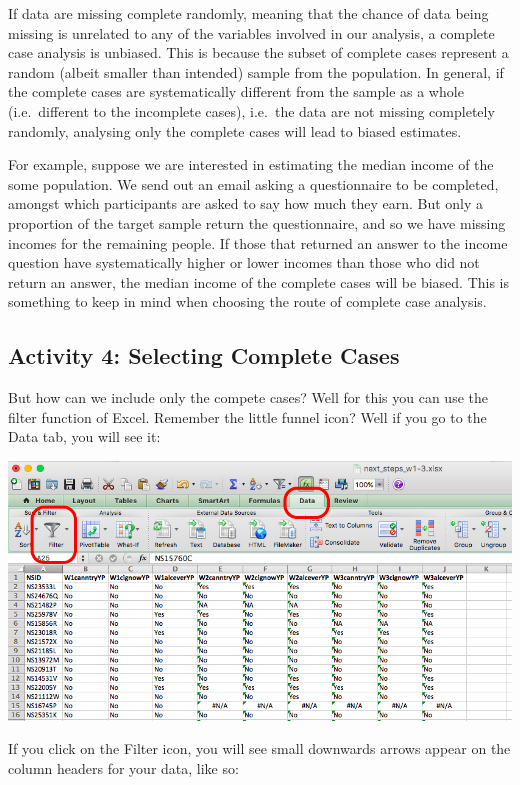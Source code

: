 \documentclass[]{book}
\theoremstyle{definition}
\theoremstyle{definition}
\theoremstyle{definition}
\theoremstyle{remark}
\begin{document}
If data are missing complete randomly, meaning that the chance of data
being missing is unrelated to any of the variables involved in our
analysis, a complete case analysis is unbiased. This is because the
subset of complete cases represent a random (albeit smaller than
intended) sample from the population. In general, if the complete cases
are systematically different from the sample as a whole (i.e.~different
to the incomplete cases), i.e.~the data are not missing completely
randomly, analysing only the complete cases will lead to biased
estimates.

For example, suppose we are interested in estimating the median income
of the some population. We send out an email asking a questionnaire to
be completed, amongst which participants are asked to say how much they
earn. But only a proportion of the target sample return the
questionnaire, and so we have missing incomes for the remaining people.
If those that returned an answer to the income question have
systematically higher or lower incomes than those who did not return an
answer, the median income of the complete cases will be biased. This is
something to keep in mind when choosing the route of complete case
analysis.

\hypertarget{activity-4-selecting-complete-cases}{%
\subsection{Activity 4: Selecting Complete
Cases}\label{activity-4-selecting-complete-cases}}

But how can we include only the compete cases? Well for this you can use
the filter function of Excel. Remember the little funnel icon? Well if
you go to the Data tab, you will see it:

\includegraphics{imgs/cc_filter.png}

If you click on the Filter icon, you will see small downwards arrows
appear on the column headers for your data, like so:
\end{document}
